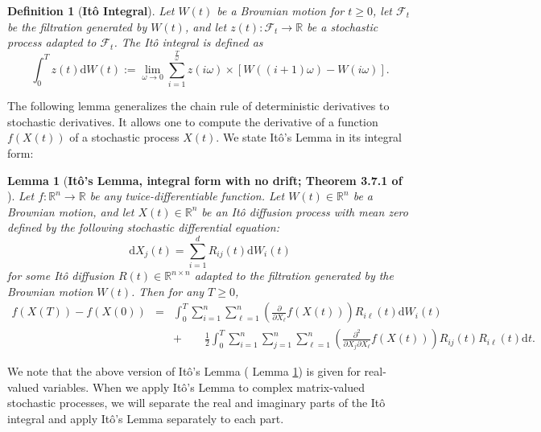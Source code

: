 \documentclass[11pt,letterpaper]{article}
\newtheorem{definition}{Definition}[section]
\newtheorem{lemma}[theorem]{Lemma}
\begin{document}
\begin{definition}[\bf It\^o Integral]
Let $W(t)$ be a Brownian motion for $t \geq 0$, let $\mathcal{F}_t$ be the filtration generated by $W(t)$, and let $z(t):  \mathcal{F}_t \rightarrow \mathbb{R}$ be a stochastic process adapted to $\mathcal{F}_t$.
%
The It\^o integral is defined as 
%
$$\int_0^T z(t) \mathrm{d}W(t) := \lim_{\omega \rightarrow 0} \sum_{i=1}^{\frac{T}{\omega}} z(i\omega)\times[W((i+1)\omega) -W(i\omega)].$$   
\end{definition}
% 

\noindent
The following lemma generalizes the chain rule of deterministic derivatives to stochastic derivatives. It allows one to compute the derivative of a function $f(X(t))$ of a stochastic process $X(t)$.
%
We state It\^o's Lemma in its integral form:
%
\begin{lemma}[\bf It\^o's Lemma, integral form with no drift; Theorem 3.7.1 of \cite{lawler2010stochastic}] \label{lemma_ito_lemma_new}
%
Let $f:  \mathbb{R}^n \rightarrow \mathbb{R}$ be any twice-differentiable function.
%
Let $W(t) \in \mathbb{R}^n$  be a Brownian motion, and let $X(t)  \in \mathbb{R}^n$ be an It\^o diffusion process with mean zero defined by the following stochastic differential equation:
%
\begin{equation}
\mathrm{d}X_j(t) = \sum_{i=1}^d R_{i j }(t) \mathrm{d}W_i(t)
\end{equation}
%
for some It\^o diffusion $R(t) \in \mathbb{R}^{n \times n}$ adapted to the filtration generated by the Brownian motion $W(t)$.
%
Then for any $T\geq 0$,
\begin{eqnarray*}
  f(X(T)) -f(X(0)) &=& \int_0^T \sum_{i=1}^n \sum_{\ell=1}^n \left(\frac{\partial}{\partial X_\ell} f(X(t))\right) R_{i \ell}(t) \mathrm{d}W_i(t)\\
  & &  +  \qquad \frac{1}{2} \int_0^T \sum_{i=1}^n \sum_{j=1}^n \sum_{\ell=1}^n \left(\frac{\partial^2}{\partial X_{j} \partial X_\ell} f(X(t))\right) R_{i j }(t) R_{i \ell}(t) \mathrm{d}t.
\end{eqnarray*}
%
%
\end{lemma}
%
\noindent
We note that the above version of It\^o's Lemma ( Lemma \ref{lemma_ito_lemma_new}) is given for real-valued variables.
%
When we apply It\^o's Lemma to complex matrix-valued stochastic processes, we will separate the real and imaginary parts of the It\^o integral and apply It\^o's Lemma separately to each part.
\end{document}
